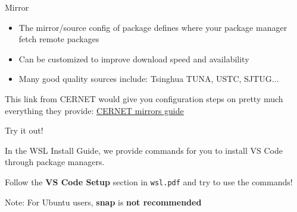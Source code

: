\begin{frame}[fragile]{Mirror}
	\begin{itemize}
		\item The mirror/source config of package defines where your package manager fetch remote packages
		\item Can be customized to improve download speed and availability
		\item Many good quality sources include: Tsinghua TUNA, USTC, SJTUG...
	\end{itemize}

	This link from CERNET would give you configuration steps on pretty much everything they provide: \href{https://help.mirrors.cernet.edu.cn/}{CERNET mirrors guide}
\end{frame}

\begin{frame}{Try it out!}

	In the WSL Install Guide, we provide commands for you to install VS Code through package managers.

	Follow the \textbf{VS Code Setup} section in \texttt{wsl.pdf} and try to use the commands!

	Note: For Ubuntu users, \textbf{snap} is \textbf{not recommended}

\end{frame}
